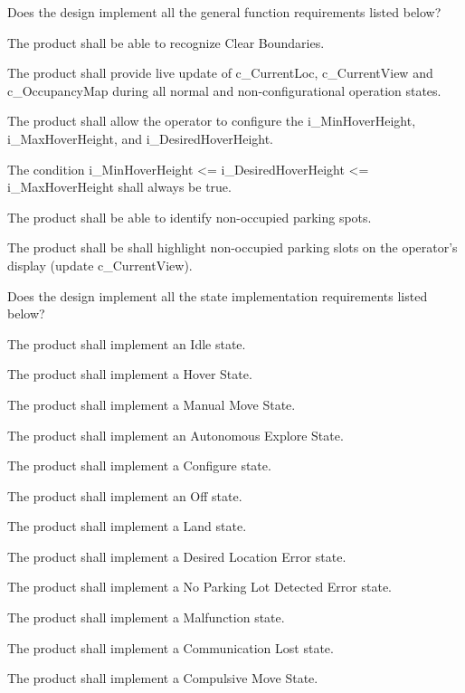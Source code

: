\documentclass[12pt, titlepage]{article}
\begin{document}
\begin{todolist}
\label{Design1_Checklist}
\item Does the design implement all the general function requirements listed below?
\begin{todolist}
    \item The product shall be able to recognize Clear Boundaries.
    \item The product shall provide live update of c_CurrentLoc, c_CurrentView and c_OccupancyMap during all normal and non-configurational operation states.
    \item The product shall allow the operator to configure the i\_MinHoverHeight, i\_MaxHoverHeight, and i\_DesiredHoverHeight.
    \item The condition i\_MinHoverHeight <= i\_DesiredHoverHeight <= i\_MaxHoverHeight shall always be true.
    \item The product shall be able to identify non-occupied parking spots.
    \item The product shall be shall highlight non-occupied parking slots on the operator's display (update c_CurrentView).
\end{todolist}
\item Does the design implement all the state implementation requirements listed below?
\begin{todolist}
    \item The product shall implement an Idle state.
    \item The product shall implement a Hover State.
    \item The product shall implement a Manual Move State.
    \item The product shall implement an Autonomous Explore State.
    \item The product shall implement a Configure state.
    \item The product shall implement an Off state.
    \item The product shall implement a Land state.
    \item The product shall implement a Desired Location Error state.
    \item The product shall implement a No Parking Lot Detected Error state.
    \item The product shall implement a Malfunction state.
    \item The product shall implement a Communication Lost state.
    \item The product shall implement a Compulsive Move State.

\end{todolist}
\end{todolist}
\end{document}
